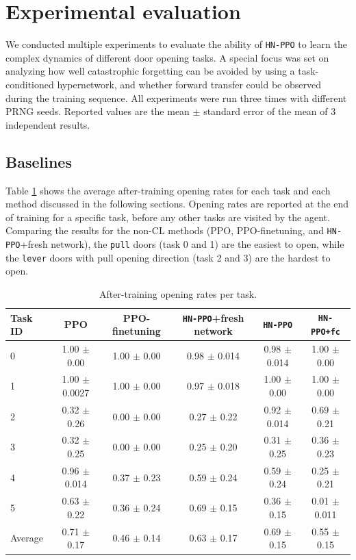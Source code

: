 \documentclass[dvipsnames]{article} %
\begin{document}
\section{Experimental evaluation}
\label{chap:experiments}
We conducted multiple experiments to evaluate the ability of \texttt{HN-PPO} to learn the complex dynamics of different door opening tasks. A special focus was set on analyzing how well catastrophic forgetting can be avoided by using a task-conditioned hypernetwork, and whether forward transfer could be observed during the training sequence. All experiments were run three times with different PRNG seeds. Reported values are the mean $\pm$ standard error of the mean of 3 independent results.

\subsection{Baselines}

Table \ref{tab:opening-rates} shows the average after-training opening rates for each task and each method discussed in the following sections. Opening rates are reported at the end of training for a specific task, before any other tasks are visited by the agent. Comparing the results for the non-CL methods (PPO, \mbox{PPO-finetuning}, and \texttt{HN-PPO}+fresh network), the \texttt{pull} doors (task 0 and 1) are the easiest to open, while the \texttt{lever} doors with pull opening direction (task 2 and 3) are the hardest to open.

\begin{table}[tb]
\caption{After-training opening rates per task.}
\label{tab:opening-rates}
\begin{center}
\begin{tabular}{@{}lccccc@{}}
\toprule
Task ID & PPO & PPO-finetuning & \texttt{HN-PPO}+fresh network & \texttt{HN-PPO} & \texttt{HN-PPO+fc} \\ 
\midrule
0 & 1.00 $\pm$ 0.00  & 1.00 $\pm$ 0.00& 0.98 $\pm$ 0.014 & 0.98 $\pm$ 0.014 & 1.00 $\pm$ 0.00\\
1 & 1.00 $\pm$ 0.0027& 1.00 $\pm$ 0.00& 0.97 $\pm$ 0.018 & 1.00 $\pm$ 0.00  & 1.00 $\pm$ 0.00 \\
2 & 0.32 $\pm$ 0.26  & 0.00 $\pm$ 0.00& 0.27 $\pm$ 0.22  & 0.92 $\pm$ 0.014 & 0.69 $\pm$ 0.21\\
3 & 0.32 $\pm$ 0.25  & 0.00 $\pm$ 0.00& 0.25 $\pm$ 0.20  & 0.31 $\pm$ 0.25  & 0.36 $\pm$ 0.23\\
4 & 0.96 $\pm$ 0.014 & 0.37 $\pm$ 0.23& 0.59 $\pm$ 0.24  & 0.59 $\pm$ 0.24  & 0.25 $\pm$ 0.21\\
5 & 0.63 $\pm$ 0.22  & 0.36 $\pm$ 0.24& 0.69 $\pm$ 0.15  & 0.36 $\pm$ 0.15  & 0.01 $\pm$ 0.011\\
\midrule
Average & 0.71 $\pm$ 0.17 & 0.46 $\pm$ 0.14 & 0.63 $\pm$ 0.17 & 0.69 $\pm$ 0.15 & 0.55 $\pm$ 0.15\\
\bottomrule
\end{tabular}
\end{center}
\end{table}
\end{document}
